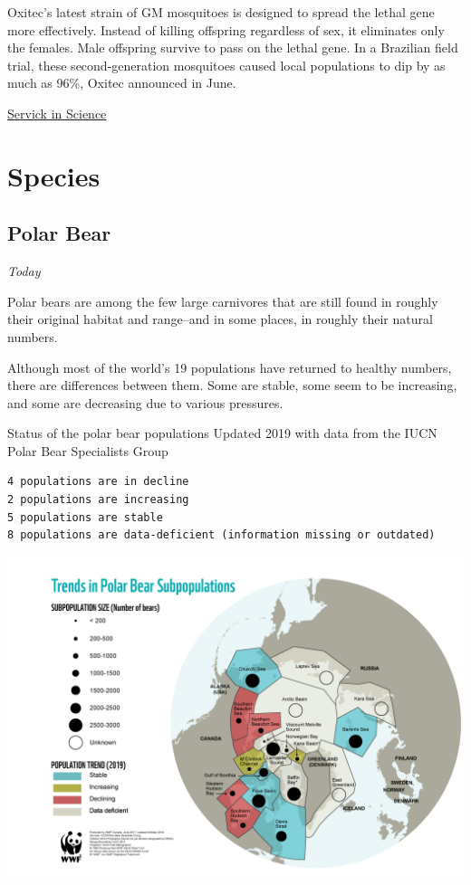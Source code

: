 \documentclass[
]{book}
\begin{document}
Oxitec's latest strain of GM mosquitoes is designed to spread the lethal gene more effectively. Instead of killing offspring regardless of sex, it eliminates only the females. Male offspring survive to pass on the lethal gene. In a Brazilian field trial, these second-generation mosquitoes caused local populations to dip by as much as 96\%, Oxitec announced in June.

\href{https://www.sciencemag.org/news/2019/09/study-dna-spread-genetically-modified-mosquitoes-prompts-backlash}{Servick in Science}

\hypertarget{species}{%
\chapter{Species}\label{species}}

\hypertarget{polar-bear}{%
\section{Polar Bear}\label{polar-bear}}

\emph{Today}

Polar bears are among the few large carnivores that are still found in roughly their original habitat and range--and in some places, in roughly their natural numbers.

Although most of the world's 19 populations have returned to healthy numbers, there are differences between them. Some are stable, some seem to be increasing, and some are decreasing due to various pressures.

Status of the polar bear populations
Updated 2019 with data from the IUCN Polar Bear Specialists Group

\begin{verbatim}
4 populations are in decline
2 populations are increasing
5 populations are stable
8 populations are data-deficient (information missing or outdated)
\end{verbatim}

\includegraphics{fig/polar_bear_populations.png}
\end{document}
